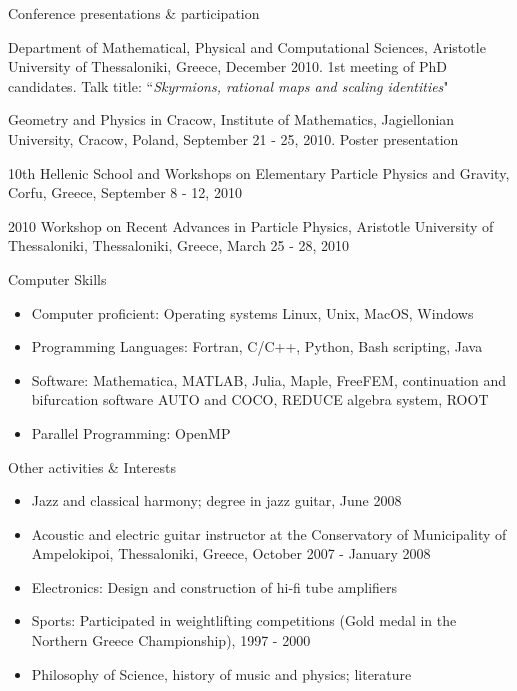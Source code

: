 \documentclass[10pt]{article} %
\newenvironment{outerlist}[1][\enskip\textbullet]%
        {\begin{itemize}[#1]}{\end{itemize}%
         \vspace{-.6\baselineskip}}
\newenvironment{innerlist}[1][\enskip\textbullet]%
        {\begin{compactitem}[#1]}{\end{compactitem}}
\begin{document}
\begin{section}{Conference presentations \& participation}
\begin{innerlist}
\item  Department of Mathematical, Physical and Computational Sciences, Aristotle University of Thessaloniki, Greece, December 2010.
       1st meeting of PhD candidates. Talk title: ``\textit{Skyrmions, rational maps and scaling identities}"
  
\item  Geometry and Physics in Cracow, Institute of Mathematics, Jagiellonian University, Cracow, Poland, 
       September 21 - 25, 2010. Poster presentation
        
\item   10th Hellenic  School and Workshops on Elementary Particle Physics and Gravity, Corfu, Greece, September 8 - 12, 2010                
        
\item   2010 Workshop on Recent Advances in Particle Physics, Aristotle University of Thessaloniki, Thessaloniki, 
        Greece, March 25 - 28, 2010  
  
\end{innerlist}

\end{section}

\begin{section}{Computer Skills}
\begin{outerlist}

\item \vskip -7mm
Computer proficient:  Operating systems Linux, Unix, MacOS, Windows
\item Programming Languages: Fortran, C/C++, Python, Bash scripting, Java
\item Software: Mathematica, MATLAB, Julia, Maple, FreeFEM, continuation and bifurcation
software AUTO and COCO, REDUCE algebra system, ROOT
\item Parallel Programming: OpenMP

\end{outerlist}

\end{section}

\begin{section}{Other activities \& Interests}
\begin{outerlist}

\item \vskip -7mm 
Jazz and classical harmony; degree in jazz guitar, June 2008
\item Acoustic and electric guitar instructor at the Conservatory 
of Municipality of Ampelokipoi, Thessaloniki, Greece, October 2007 - January 2008
\item Electronics: Design and construction of hi-fi tube amplifiers
\item Sports: Participated in weightlifting competitions (Gold medal in the 
Northern Greece Championship), 1997 - 2000
\item Philosophy of Science, history of music and physics; literature
\end{outerlist}

\end{section}
\end{document}
